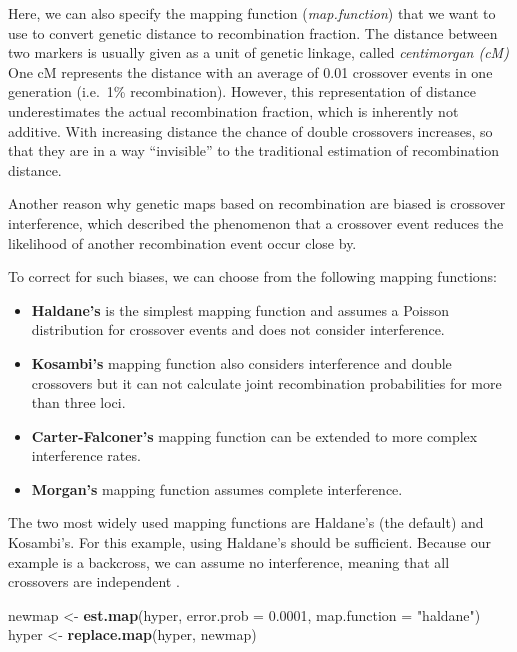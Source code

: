 \documentclass[12pt,]{krantz}
\newenvironment{Shaded}{\begin{snugshade}}{\end{snugshade}}
\newcommand{\KeywordTok}[1]{\textcolor[rgb]{0.27,0.27,0.27}{\textbf{{#1}}}}
\newcommand{\DataTypeTok}[1]{\textcolor[rgb]{0.27,0.27,0.27}{{#1}}}
\newcommand{\FloatTok}[1]{\textcolor[rgb]{0.06,0.06,0.06}{{#1}}}
\newcommand{\StringTok}[1]{\textcolor[rgb]{0.5,0.5,0.5}{{#1}}}
\newcommand{\NormalTok}[1]{{#1}}
\providecommand{\tightlist}{%
  \setlength{\itemsep}{0pt}\setlength{\parskip}{0pt}}
\begin{document}
Here, we can also specify the mapping function (\emph{map.function})
that we want to use to convert genetic distance to recombination
fraction. The distance between two markers is usually given as a unit of
genetic linkage, called \emph{centimorgan (cM)} One cM represents the
distance with an average of 0.01 crossover events in one generation
(i.e.~1\% recombination). However, this representation of distance
underestimates the actual recombination fraction, which is inherently
not additive. With increasing distance the chance of double crossovers
increases, so that they are in a way ``invisible'' to the traditional
estimation of recombination distance.

Another reason why genetic maps based on recombination are biased is
crossover interference, which described the phenomenon that a crossover
event reduces the likelihood of another recombination event occur close
by.

To correct for such biases, we can choose from the following mapping
functions:

\begin{itemize}
\tightlist
\item
  \textbf{Haldane's} is the simplest mapping function and assumes a
  Poisson distribution for crossover events and does not consider
  interference.
\item
  \textbf{Kosambi's} mapping function also considers interference and
  double crossovers but it can not calculate joint recombination
  probabilities for more than three loci.
\item
  \textbf{Carter-Falconer's} mapping function can be extended to more
  complex interference rates.
\item
  \textbf{Morgan's} mapping function assumes complete interference.
\end{itemize}

The two most widely used mapping functions are Haldane's (the default)
and Kosambi's. For this example, using Haldane's should be sufficient.
Because our example is a backcross, we can assume no interference,
meaning that all crossovers are independent \citep{lynch1998genetics}.

\begin{Shaded}
\begin{Highlighting}[]
\NormalTok{newmap <-}\StringTok{ }\KeywordTok{est.map}\NormalTok{(hyper, }\DataTypeTok{error.prob =} \FloatTok{0.0001}\NormalTok{, }
                  \DataTypeTok{map.function =} \StringTok{"haldane"}\NormalTok{)}
\NormalTok{hyper <-}\StringTok{ }\KeywordTok{replace.map}\NormalTok{(hyper, newmap)}
\end{Highlighting}
\end{Shaded}
\end{document}
